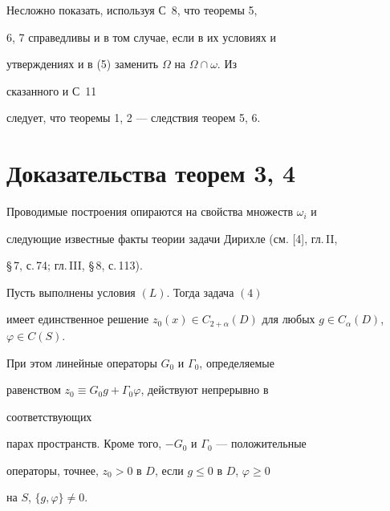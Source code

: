  


\begin{note} 


Несложно показать, используя С~8, что теоремы 5, 


6, 7 справедливы и в том случае, если в их условиях и 


утверждениях и в (5) заменить $\Omega$ на $\Omega\cap\omega$. Из 


сказанного и С~11 


следует, что теоремы 1, 2 --- следствия теорем 5, 6. 


\end{note}


 


\section{Доказательства теорем 3, 4} 


 


Проводимые построения опираются на свойства множеств $\omega_i$ и 


следующие известные факты теории задачи Дирихле (см. [4], гл.\,II, 


\S\,7, с.\,74; гл.\,III, \S\,8, с.\,113). 


 


\begin{prop} 


Пусть выполнены условия $(L)$. Тогда задача $(4)$ 


имеет единственное решение $z_0(x)\in C_{2+\alpha}(D)$ для любых $g\in 


C_\alpha(D)$, $\varphi\in C(S)$. 


При этом линейные операторы $G_0$ и $\Gamma_0$, определяемые 


равенством $z_0\equiv G_0g+\Gamma_0\varphi$, действуют непрерывно в 


соответствующих 


парах пространств. Кроме того, $-G_0$ и $\Gamma_0$ --- положительные 


операторы, точнее, $z_0>0$ в $D$, если $g\le0$ в $D$, $\varphi\ge0$ 


на $S$, $\{g,\varphi\}\ne0$. 


\end{prop} 


 


